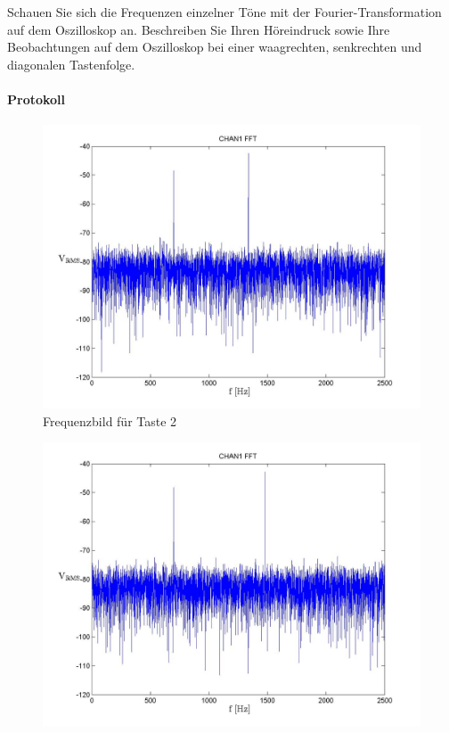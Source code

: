 \documentclass[10pt]{report}
\begin{document}
        Schauen Sie sich die Frequenzen einzelner Töne mit der Fourier-Transformation auf dem
        Oszilloskop an. Beschreiben Sie Ihren Höreindruck sowie Ihre Beobachtungen auf dem
        Oszilloskop bei einer waagrechten, senkrechten und diagonalen Tastenfolge.
        \paragraph{Protokoll}
        \begin{center}
            \begin{figure}[H]
                \includegraphics[width=\textwidth]{Screenshot_GUI_431_T2_chan1_fft.jpg}
                \caption{Frequenzbild für Taste 2}
            \end{figure}
            \begin{figure}[H]
                \includegraphics[width=\textwidth]{Screenshot_GUI_431_T3_chan1_fft.jpg}

\end{figure}
\end{center}
\end{document}
